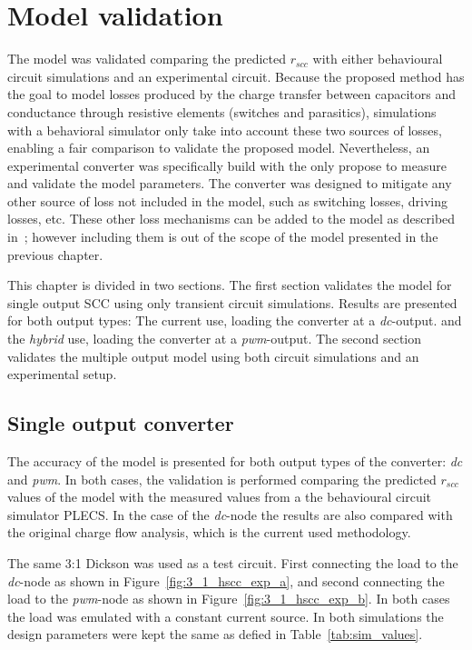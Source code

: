 \chapter{Model validation}
The model was validated comparing the predicted $r_{scc}$ with either behavioural circuit simulations and an experimental circuit.  Because the proposed method has the goal to model losses produced by the charge transfer between capacitors and conductance through resistive elements (switches and parasitics), simulations with a behavioral simulator only take into account these two sources of losses, enabling a fair comparison to validate the proposed model.  Nevertheless, an experimental converter was specifically build with the only propose to measure and validate the model parameters. The converter was designed to mitigate any other source of loss not included in the model, such as switching losses, driving losses, etc. These other loss mechanisms can be added to the model as described in~\cite{Seeman:EECS-2009-78}; however including them is out of the scope of the model presented in the previous chapter.

This chapter is divided in two sections. The first section validates the model for single output SCC using only transient circuit simulations. Results are presented for both output types: The current use, loading the converter at a \emph{dc}-output. and the \emph{hybrid} use, loading the converter at a \emph{pwm}-output.  The second section validates the multiple output model using both circuit simulations and an experimental setup.

\section{Single output converter}
The accuracy of the model is presented for both output types of the converter:
\emph{dc} and \emph{pwm}. In both cases, the validation is performed comparing the predicted $r_{scc}$ values of the model with the measured values from a the behavioural circuit simulator PLECS. In the case of the \emph{dc}-node the results are also compared with the original charge flow analysis, which is the current used methodology.

The same 3:1 Dickson was used as a test circuit. First connecting the load to the \emph{dc}-node as shown in Figure~\ref{fig:3_1_hscc_exp_a}, and second connecting the load to the \emph{pwm}-node as shown in Figure~\ref{fig:3_1_hscc_exp_b}. In both cases the load was emulated with a constant current source. In both simulations the design parameters were kept the same as defied in Table~\ref{tab:sim_values}.

